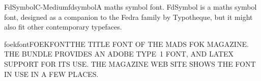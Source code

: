 \documentclass{ddltxtyp}
\begin{document}
\begin{package}{FdSymbolC-Medium}{fdsymbol}{A maths symbol font.}
FdSymbol is a maths symbol font, designed as a companion to the
Fedra family by Typotheque, but it might also fit other
contemporary typefaces.
\end{package}
\begin{package}{foekfont}{FOEKFONT}{\uppercase{The title font of the mads fok magazine.}}
\uppercase{The bundle provides an adobe type~1 font, and {\LaTeX} support for
its use. The magazine web site shows the font in use in a few
places.}
\end{package}

\end{document}
